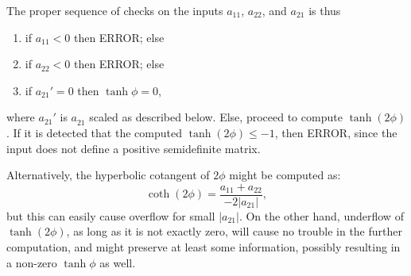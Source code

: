 \documentclass[a4paper,12pt,twoside]{article}
\begin{document}
The proper sequence of checks on the inputs $a_{11}$, $a_{22}$, and
$a_{21}$ is thus
\begin{enumerate}
\item if $a_{11}<0$ then ERROR; else
\item if $a_{22}<0$ then ERROR; else
\item if $a_{21}'=0$ then $\tanh\phi=0$,
\end{enumerate}
where $a_{21}'$ is $a_{21}^{}$ scaled as described below.  Else,
proceed to compute $\tanh(2\phi)$.  If it is detected that the
computed $\tanh(2\phi)\le-1$, then ERROR, since the input does not
define a positive semidefinite matrix.

Alternatively, the hyperbolic cotangent of $2\phi$ might be computed
as:
\begin{equation}
  \coth(2\phi)=\frac{a_{11}+a_{22}}{-2|a_{21}|},
  \label{l:16}
\end{equation}
but this can easily cause overflow for small $|a_{21}|$.  On the other
hand, underflow of $\tanh(2\phi)$, as long as it is not exactly zero,
will cause no trouble in the further computation, and might preserve
at least some information, possibly resulting in a non-zero
$\tanh\phi$ as well.
\end{document}
